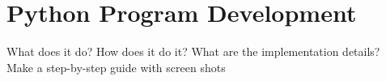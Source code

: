 \documentclass[../00_main.tex]{subfiles}
\begin{document}
\section{Python Program Development}

What does it do? How does it do it? What are the implementation details?
\\
Make a step-by-step guide with screen shots
\end{document}
